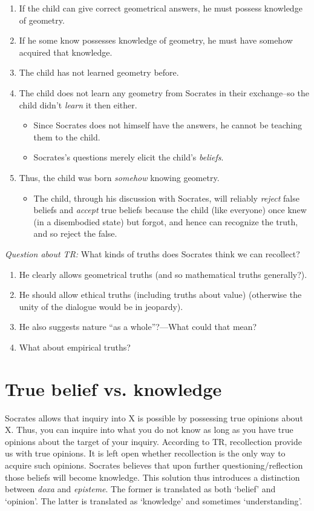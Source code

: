 \documentclass[10 pt]{article}
\begin{document}
\begin{enumerate}
\item If the child can give correct geometrical answers, he must possess knowledge of geometry. 
\item If he some know possesses knowledge of geometry, he must have somehow acquired that knowledge.
\item The child has not learned geometry before. 
\item The child does not learn any geometry from Socrates in their exchange--so the child didn't \emph{learn} it then either.
\begin{itemize}
\item Since Socrates does not himself have the answers, he cannot be teaching them to the child. 
\item Socrates's questions merely elicit the child's \emph{beliefs}. 
\end{itemize}
\item Thus, the child was born \emph{somehow} knowing geometry.
\begin{itemize}
\item The child, through his discussion with Socrates, will reliably \emph{reject} false beliefs and \emph{accept} true beliefs because the child (like everyone) once knew (in a disembodied state) but forgot, and hence can recognize the truth, and so reject the false. 
\end{itemize} 
\end{enumerate}
\noindent \emph{Question about TR:} What kinds of truths does Socrates think we can recollect?
\begin{enumerate}
\item He clearly allows geometrical truths (and so mathematical truths generally?). 
\item He should allow ethical truths (including truths about value) (otherwise the unity of the dialogue would be in jeopardy). 
\item He also suggests nature ``as a whole''?---What could that mean?\item What about empirical truths? 
\end{enumerate}
 
 

\section*{True belief vs. knowledge}
Socrates allows that inquiry into X is possible by possessing true opinions about X. Thus, you can inquire into what you do not know as long as you have true opinions about the target of your inquiry. According to TR, recollection provide us with true opinions. It is left open whether recollection is the only way to acquire such opinions. Socrates believes that upon further questioning/reflection those beliefs will become knowledge. This solution thus introduces a distinction between \emph{doxa} and \emph{episteme}. The former is translated as both `belief' and `opinion'. The latter is translated as `knowledge' and sometimes `understanding'. 
\end{document}
